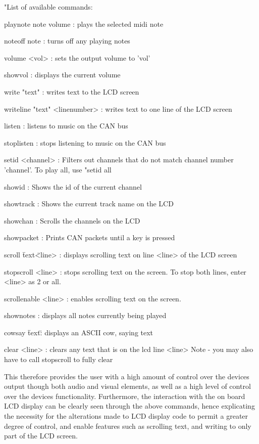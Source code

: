 "List of available commands:\par\bigskip\noindent
playnote note volume   : plays the selected midi note\par\noindent
noteoff note           : turns off any playing notes\par\noindent
volume <vol>           : sets the output volume to 'vol'\par\noindent
showvol                : displays the current volume\par\noindent
write "text"           : writes text to the LCD screen\par\noindent
writeline "text" <linenumber> : writes text to one line of the 
LCD screen\par\noindent
listen                 : listens to music on the CAN bus\par\noindent
stoplisten             : stops listening to music on the CAN bus\par\noindent
setid <channel>        : Filters out channels that do not match 
channel number 'channel'. 
To play all, use "setid all\par\noindent
showid                 : Shows the id of the current channel\par\noindent
showtrack              : Shows the current track name on the LCD\par\noindent
showchan               : Scrolls the channels on the LCD\par\noindent
showpacket             : Prints CAN packets until a key is pressed\par\noindent
scroll \"text\" <line> : displays scrolling text on line <line> of the 
LCD screen\par\noindent
stopscroll <line>      : stops scrolling text on the screen. To stop both lines, 
enter <line> as 2 or all.\par\noindent
scrollenable <line>    : enables scrolling text on the screen.\par\noindent
shownotes              : displays all notes currently being played\par\noindent
cowsay \"text\"        : displays an ASCII cow, saying text\par\noindent
clear <line>           : clears any text that is on the lcd line <line> 
Note - you may also have to call stopscroll to fully clear\par\noindent
\par\bigskip\noindent
This therefore provides the user with a high amount of control over the devices 
output though both audio and visual elements, as well as a high level of control 
over the devices functionality. Furthermore, the interaction with 
the on board LCD display can be clearly seen through the above commands, hence 
explicating the necessity for the alterations made to LCD display code to permit 
a greater degree of control, and enable features such as scrolling text, and 
writing to only part of the LCD screen. 

